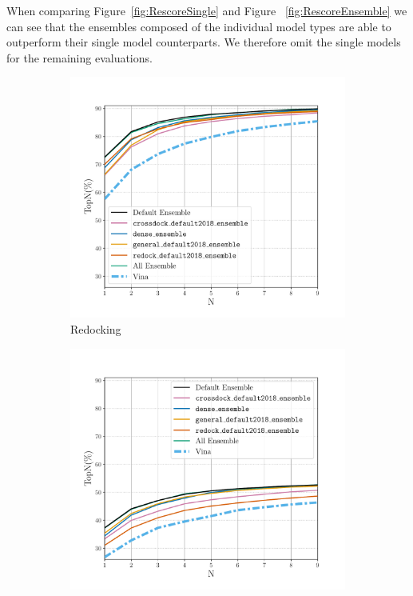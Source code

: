 \documentclass[journal=jcisd8,manuscript=article]{achemso}
\begin{document}
When comparing Figure~\ref{fig:RescoreSingle} and Figure ~\ref{fig:RescoreEnsemble} we can see that the ensembles composed of the individual model types are able to outperform their single model counterparts. We therefore omit the single models for the remaining evaluations.

\begin{figure}
	\begin{subfigure}[b]{0.48\textwidth}
		\centering
		\includegraphics[width=\textwidth]{figures/redocking/rescore_ensembles_line.pdf}
		\caption{Redocking}
		\label{fig:RescoreEnsembleRedock}
        \end{subfigure}    
	\begin{subfigure}[b]{0.48\textwidth} 
		\centering
		\includegraphics[width=\textwidth]{figures/crossdocking/rescore_ensembles_line.pdf}

\end{subfigure}
\end{figure}
\end{document}
